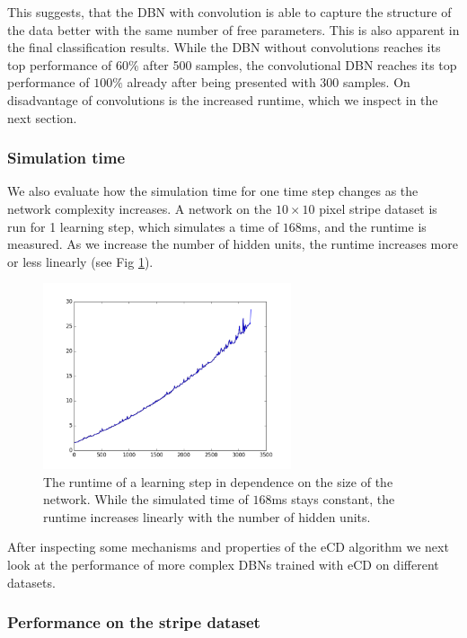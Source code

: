 This suggests, that the DBN with convolution is able to capture the structure of the data better with the same number of free parameters. 
This is also apparent in the final classification results.
While the DBN without convolutions reaches its top performance of $60 \%$ after 500 samples, the convolutional DBN reaches its top performance of $100 \%$ already after being presented with 300 samples.
On disadvantage of convolutions is the increased runtime, which we inspect in the next section.

\subsubsection{Simulation time} \label{c:simtimeexp}

We also evaluate how the simulation time for one time step changes as the network complexity increases.
A network on the $10 \times 10$ pixel stripe dataset is run for 1 learning step, which simulates a time of $168$ms, and the runtime is measured.
As we increase the number of hidden units, the runtime increases more or less linearly (see Fig \ref{fig:simtime}).

\begin{figure}[h!]
	\centering
    	\includegraphics[width=0.65\textwidth]{imgs/runtime-1.png} 
    \caption{The runtime of a learning step in dependence on the size of the network. While the simulated time of $168$ms stays constant, the runtime increases linearly with the number of hidden units.}
	\label{fig:simtime}
\end{figure}

After inspecting some mechanisms and properties of the eCD algorithm we next look at the performance of more complex DBNs trained with eCD on different datasets.

\subsubsection{Performance on the stripe dataset} \label{c:stripeexp}

